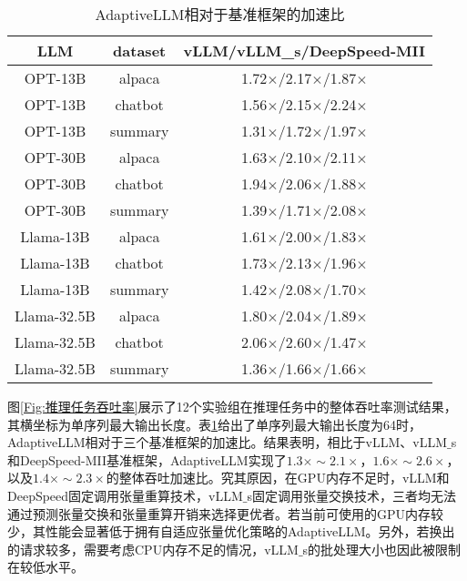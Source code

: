 \begin{table}[H]
  \centering
  \caption{AdaptiveLLM相对于基准框架的加速比}
  \label{Table:AdaptiveLLM相对于基准框架的加速比}
  \renewcommand{\arraystretch}{1.25}
  \small
  \begin{tabular}{c c c}
    \toprule
    \textbf{LLM} & \textbf{dataset} & \textbf{vLLM/vLLM\_s/DeepSpeed-MII} \\
    \midrule
    OPT-13B	& alpaca & 1.72$\times$/2.17$\times$/1.87$\times$ \\
    OPT-13B	& chatbot & 1.56$\times$/2.15$\times$/2.24$\times$ \\
    OPT-13B	& summary & 1.31$\times$/1.72$\times$/1.97$\times$ \\
    OPT-30B	& alpaca & 1.63$\times$/2.10$\times$/2.11$\times$ \\
    OPT-30B	& chatbot & 1.94$\times$/2.06$\times$/1.88$\times$ \\
    OPT-30B	& summary & 1.39$\times$/1.71$\times$/2.08$\times$ \\
    Llama-13B & alpaca & 1.61$\times$/2.00$\times$/1.83$\times$ \\
    Llama-13B & chatbot & 1.73$\times$/2.13$\times$/1.96$\times$ \\
    Llama-13B & summary & 1.42$\times$/2.08$\times$/1.70$\times$ \\
    Llama-32.5B & alpaca & 1.80$\times$/2.04$\times$/1.89$\times$ \\
    Llama-32.5B & chatbot & 2.06$\times$/2.60$\times$/1.47$\times$ \\
    Llama-32.5B & summary & 1.36$\times$/1.66$\times$/1.66$\times$ \\
    \bottomrule
  \end{tabular}
\end{table}

图\ref{Fig:推理任务吞吐率}展示了12个实验组在推理任务中的整体吞吐率测试结果，其横坐标为单序列最大输出长度。表\ref{Table:AdaptiveLLM相对于基准框架的加速比}给出了单序列最大输出长度为64时，AdaptiveLLM相对于三个基准框架的加速比。结果表明，相比于vLLM、vLLM$\_$s和DeepSpeed-MII基准框架，AdaptiveLLM实现了$1.3\times\sim2.1\times$，$1.6\times\sim2.6\times$，以及$1.4\times\sim2.3\times$的整体吞吐加速比。究其原因，在GPU内存不足时，vLLM和DeepSpeed固定调用张量重算技术，vLLM$\_$s固定调用张量交换技术，三者均无法通过预测张量交换和张量重算开销来选择更优者。若当前可使用的GPU内存较少，其性能会显著低于拥有自适应张量优化策略的AdaptiveLLM。另外，若换出的请求较多，需要考虑CPU内存不足的情况，vLLM$\_$s的批处理大小也因此被限制在较低水平。

